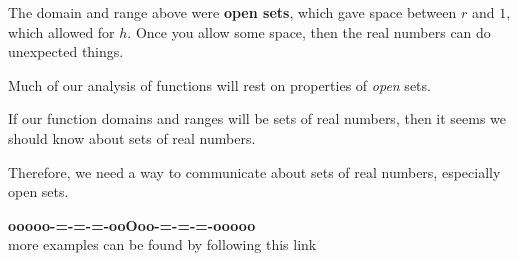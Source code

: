\documentclass{ximera}
\begin{document}
The domain and range above were \textbf{\textcolor{purple!85!blue}{open sets}}, which gave space between $r$ and $1$, which allowed for $h$. Once you allow some space, then the real numbers can do unexpected things.

Much of our analysis of functions will rest on properties of \textit{open} sets. 


If our function domains and ranges will be sets of real numbers, then it seems we should know about sets of real numbers.

Therefore, we need a way to communicate about sets of real numbers, especially open sets.













\begin{onlineOnly}
\begin{center}
\textbf{\textcolor{green!50!black}{ooooo-=-=-=-ooOoo-=-=-=-ooooo}} \\

more examples can be found by following this link\\ 

\end{center}
\end{onlineOnly}
\end{document}
